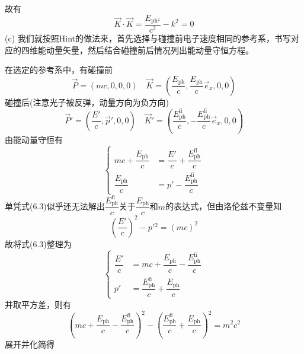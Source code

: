 \begin{solution}
    故有
    \[\vec{K}\cdot\vec{K}=\dfrac{E_{\mathrm{ph}{}^2}}{c^2}-k^2=0\]
    (c) 我们就按照Hint的做法来，首先选择与碰撞前电子速度相同的参考系，书写对应的四维能动量矢量，然后结合碰撞前后情况列出能动量守恒方程。

    在选定的参考系中，有碰撞前
    \begin{equation}
        \vec{P} = (mc,0,0,0)\quad\vec{K}=(\dfrac{E_{\mathrm{ph}}}{c},\dfrac{E_{\mathrm{ph}}}{c}\vec{e}_x,0,0)
    \end{equation}
    碰撞后(注意光子被反弹，动量方向为负方向)
    \begin{equation}
        \vec{P}'=(\dfrac{E'}{c},\vec{p}',0,0)\quad\vec{K}'=(\dfrac{E_{\mathrm{ph}}^{\mathrm{fi}}}{c},-\dfrac{E_{\mathrm{ph}}^{\mathrm{fi}}}{c}\vec{e}_x,0,0)
    \end{equation}
    由能动量守恒有
    \begin{equation}
        \left\{
        \begin{aligned}
            mc+\dfrac{E_{\mathrm{ph}}}{c} & =\dfrac{E'}{c}+\dfrac{E_{\mathrm{ph}}^{\mathrm{fi}}}{c} \\
            \dfrac{E_{\mathrm{ph}}}{c}    & =p'-\dfrac{E_{\mathrm{ph}}^{\mathrm{fi}}}{c}
        \end{aligned}
        \right.
    \end{equation}
    单凭式(6.3)似乎还无法解出$\dfrac{E_{\mathrm{ph}}^{\mathrm{fi}}}{c}$关于$ \dfrac{E_{\mathrm{ph}}}{c}$和$m$的表达式，但由洛伦兹不变量知
    \begin{equation}
        \left(\dfrac{E'}{c}\right)^2-p'{}^2=(mc)^2
    \end{equation}
    故将式(6.3)整理为
    \begin{equation}
        \left\{
        \begin{aligned}
            \dfrac{E'}{c} & =mc+\dfrac{E_{\mathrm{ph}}}{c}-\dfrac{E_{\mathrm{ph}}^{\mathrm{fi}}}{c} \\
            p'            & =\dfrac{E_{\mathrm{ph}}^{\mathrm{fi}}}{c}+\dfrac{E_{\mathrm{ph}}}{c}
        \end{aligned}
        \right.
    \end{equation}
    并取平方差，则有
    \begin{equation}
        \left(mc+\dfrac{E_{\mathrm{ph}}}{c}-\dfrac{E_{\mathrm{ph}}^{\mathrm{fi}}}{c}\right)^2-\left(\dfrac{E_{\mathrm{ph}}^{\mathrm{fi}}}{c}+\dfrac{E_{\mathrm{ph}}}{c}\right)^2=m^2c^2
    \end{equation}
    展开并化简得
    \begin{equation}

\end{equation}
\end{solution}
